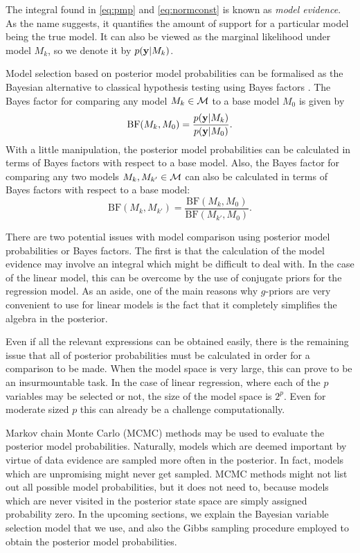 \documentclass[a4paper,showframe,11pt]{report}
\begin{document}
The integral found in \cref{eq:pmp} and \cref{eq:normconst} is known as \emph{model evidence}.
As the name suggests, it quantifies the amount of support for a particular model being the true model.
It can also be viewed as the marginal likelihood under model $M_k$, so we denote it by $p({\mathbf y}|M_k)$.

Model selection based on posterior model probabilities can be formalised as the Bayesian alternative to classical hypothesis testing using Bayes factors \citep{kass1995bayes}.
The Bayes factor for comparing any model $M_k \in {\mathcal M}$ to a base model $M_0$ is given by
\[
  \text{BF}(M_k,M_0) = \frac{p({\mathbf y}|M_k)}{p({\mathbf y}|M_0)}.
\]
With a little manipulation, the posterior model probabilities can be calculated in terms of Bayes factors with respect to a base model.
Also, the Bayes factor for comparing any two models $M_k,M_{k'} \in {\mathcal M}$ can also be calculated in terms of Bayes factors with respect to a base model:
\[
    \text{BF}(M_k,M_{k'}) = \frac{\text{BF}(M_k,M_0)}{\text{BF}(M_{k'},M_0)}.
\]

There are two potential issues with model comparison using posterior model probabilities or Bayes factors.
The first is that the calculation of the model evidence may involve an integral which might be difficult to deal with.
In the case of the linear model, this can be overcome by the use of conjugate priors for the regression model.
As an aside, one of the main reasons why $g$-priors \citep{zellner1986assessing} are very convenient to use for linear models is the fact that it completely simplifies the algebra in the posterior.

Even if all the relevant expressions can be obtained easily, there is the remaining issue that all of posterior probabilities must be calculated in order for a comparison to be made.
When the model space is very large, this can prove to be an insurmountable task.
In the case of linear regression, where each of the $p$ variables may be selected or not, the size of the model space is $2^p$.
Even for moderate sized $p$ this can already be a challenge computationally.

Markov chain Monte Carlo (MCMC) methods may be used to evaluate the posterior model probabilities.
Naturally, models which are deemed important by virtue of data evidence are sampled more often in the posterior.
In fact, models which are unpromising might never get sampled. 
MCMC methods might not list out all possible model probabilities, but it does not need to, because models which are never visited in the posterior state space are simply assigned probability zero.
In the upcoming sections, we explain the Bayesian variable selection model that we use, and also the Gibbs sampling procedure employed to obtain the posterior model probabilities.
\end{document}
